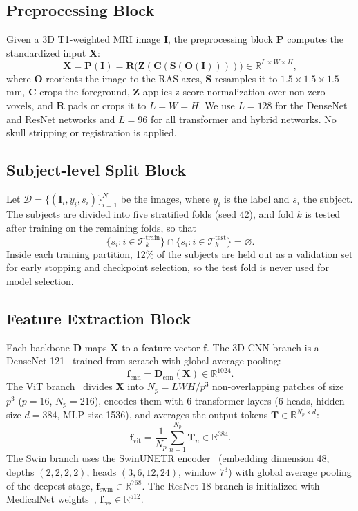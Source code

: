 \documentclass[conference,a4paper]{IEEEtran}
\newcommand{\R}{\mathbb{R}}
\begin{document}
\subsection{Preprocessing Block}
Given a 3D T1-weighted MRI image $\mathbf{I}$, the preprocessing block $\mathbf{P}$ computes the standardized input $\mathbf{X}$:
\begin{equation}
\mathbf{X}=\mathbf{P}(\mathbf{I})=\mathbf{R}\big(\mathbf{Z}(\mathbf{C}(\mathbf{S}(\mathbf{O}(\mathbf{I}))))\big)\in\R^{L\times W\times H},
\end{equation}
where $\mathbf{O}$ reorients the image to the RAS axes, $\mathbf{S}$ resamples it to $1.5\times1.5\times1.5$\,mm, $\mathbf{C}$ crops the foreground, $\mathbf{Z}$ applies z-score normalization over non-zero voxels, and $\mathbf{R}$ pads or crops it to $L=W=H$. We use $L=128$ for the DenseNet and ResNet networks and $L=96$ for all transformer and hybrid networks. No skull stripping or registration is applied.

\subsection{Subject-level Split Block}
Let $\mathcal{D}=\{(\mathbf{I}_i,y_i,s_i)\}_{i=1}^{N}$ be the images, where $y_i$ is the label and $s_i$ the subject. The subjects are divided into five stratified folds (seed 42), and fold $k$ is tested after training on the remaining folds, so that
\begin{equation}
\{s_i : i\in\mathcal{T}^{\mathrm{train}}_k\}\cap\{s_i : i\in\mathcal{T}^{\mathrm{test}}_k\}=\varnothing .
\end{equation}
Inside each training partition, 12\% of the subjects are held out as a validation set for early stopping and checkpoint selection, so the test fold is never used for model selection.

\subsection{Feature Extraction Block}
Each backbone $\mathbf{D}$ maps $\mathbf{X}$ to a feature vector $\mathbf{f}$. The 3D CNN branch is a DenseNet-121~\cite{huang2017densely} trained from scratch with global average pooling:
\begin{equation}
\mathbf{f}_{\mathrm{cnn}}=\mathbf{D}_{\mathrm{cnn}}(\mathbf{X})\in\R^{1024}.
\end{equation}
The ViT branch~\cite{dosovitskiy2021image} divides $\mathbf{X}$ into $N_p=LWH/p^{3}$ non-overlapping patches of size $p^3$ ($p=16$, $N_p=216$), encodes them with 6 transformer layers (6 heads, hidden size $d=384$, MLP size 1536), and averages the output tokens $\mathbf{T}\in\R^{N_p\times d}$:
\begin{equation}
\mathbf{f}_{\mathrm{vit}}=\frac{1}{N_p}\sum_{n=1}^{N_p}\mathbf{T}_n\in\R^{384}.
\end{equation}
The Swin branch uses the SwinUNETR encoder~\cite{hatamizadeh2021swinunetr} (embedding dimension 48, depths $(2,2,2,2)$, heads $(3,6,12,24)$, window $7^3$) with global average pooling of the deepest stage, $\mathbf{f}_{\mathrm{swin}}\in\R^{768}$. The ResNet-18 branch is initialized with MedicalNet weights~\cite{chen2019med3d}, $\mathbf{f}_{\mathrm{res}}\in\R^{512}$.
\end{document}
